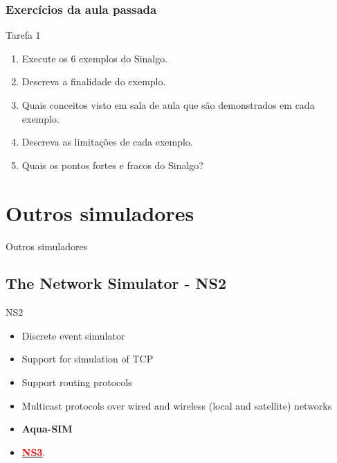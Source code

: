 \documentclass{beamer}
\begin{document}
\begin{frame}\frametitle{Exercícios da aula passada}
	\begin{alertblock}{Tarefa 1}
		\begin{enumerate}
			\item Execute os 6 exemplos do Sinalgo.
			\item Descreva a finalidade do exemplo.
			\item Quais conceitos visto em sala de aula que são demonstrados em cada exemplo.
			\item Descreva as limitações de cada exemplo.
			\item Quais os pontos fortes e fracos do Sinalgo?
		\end{enumerate}
	\end{alertblock}
\end{frame}


\section{Outros simuladores} %

\begin{frame}
    \centering
    Outros simuladores
\end{frame}

\subsection{The Network Simulator - NS2}

\begin{frame}

\begin{block}{NS2}
	\begin{itemize}
		\item Discrete event simulator
		\item Support for simulation of TCP
		\item Support routing protocols
		\item Multicast protocols over wired and wireless (local and satellite) networks
		\item \textbf{Aqua-SIM}
		\item \href{https://www.nsnam.org/}{\textcolor{red}{\textbf{NS3}}}.
	\end{itemize}
\end{block}

\end{frame}
\end{document}
